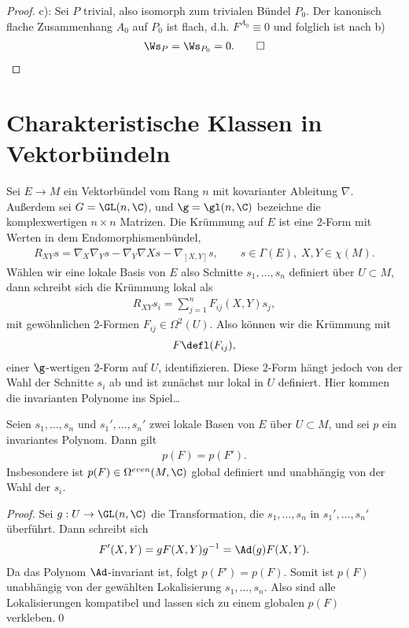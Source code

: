 \documentclass[%
	paper=a5,%
	fleqn,%
	DIV=18,%
	BCOR=0mm,
	fontsize=11pt,
	titlepage=false,%
	bibliography=totoc,
	DIV=18,%
	twoside=true,
	pdftitle=Riemannsche Geometrie,
	pdfauthor=Uwe Semmelmann,
	numbers=noendperiod]%
	{scrbook}
\begin{document}
\begin{proof}
c): Sei $P$ trivial, also isomorph zum trivialen Bündel $P_0$. Der
kanonisch flache Zusammenhang $A_0$ auf $P_0$ ist flach, d.h. $F^{A_0}\equiv 0$
und folglich ist nach b)
\begin{align*}
\Ws_P = \Ws_{P_0} = 0.\qed
\end{align*}

\end{proof}

\section{Charakteristische Klassen in Vektorbündeln}

Sei $E\to M$ ein Vektorbündel vom Rang $n$ mit kovarianter Ableitung $\nabla$.
Außerdem sei $G = \GL(n,\C)$, und $\g = \gl(n,\C)$ bezeichne die
komplexwertigen $n\times n$ Matrizen. Die Krümmung auf $E$ ist eine 2-Form mit
Werten in dem Endomorphismenbündel,
\begin{align*}
R_{XY}s = \nabla_X\nabla_Y s - \nabla_Y \nabla X s - \nabla_{[X,Y]}s,\qquad
s\in \Gamma(E),\; X,Y\in \chi(M).
\end{align*}
Wählen wir eine lokale Basis von $E$ also Schnitte $s_1,\ldots,s_n$ definiert
über $U\subset M$, dann schreibt sich die Krümmung lokal als
\begin{align*}
R_{XY}s_i = \sum_{j=1}^n F_{ij}(X,Y)s_j,
\end{align*}
mit gewöhnlichen 2-Formen $F_{ij}\in\Omega^2(U)$. Also können wir die Krümmung
mit
\begin{align*}
F \defl (F_{ij}), 
\end{align*}
einer $\g$-wertigen 2-Form auf $U$, identifizieren. Diese 2-Form hängt jedoch von
der Wahl der Schnitte $s_i$ ab und ist zunächst nur lokal in $U$ definiert. Hier
kommen die invarianten Polynome ins Spiel\ldots

\begin{lem}
Seien $s_1,\ldots,s_n$ und $s_1',\ldots,s_n'$ zwei lokale Basen von $E$ über
$U\subset M$, und sei $p$ ein invariantes Polynom. Dann gilt
\begin{align*}
p(F) = p(F').
\end{align*}
Insbesondere ist $p(F)\in\Omega^{even}(M,\C)$ global definiert und unabhängig
von der Wahl der $s_i$.\fish
\end{lem}

\begin{proof}
Sei $g: U\to \GL(n,\C)$ die Transformation, die $s_1,\ldots,s_n$ in
$s_1',\ldots,s_n'$ überführt. Dann schreibt sich
\begin{align*}
F'(X,Y) = gF(X,Y)g^{-1} = \Ad(g)F(X,Y).
\end{align*}
Da das Polynom $\Ad$-invariant ist, folgt $p(F') = p(F)$. Somit ist $p(F)$
unabhängig von der gewählten Lokalisierung $s_1,\ldots,s_n$. Also sind alle
Lokalisierungen kompatibel und lassen sich zu einem globalen $p(F)$
verkleben.\qed
\end{proof}
\end{document}
